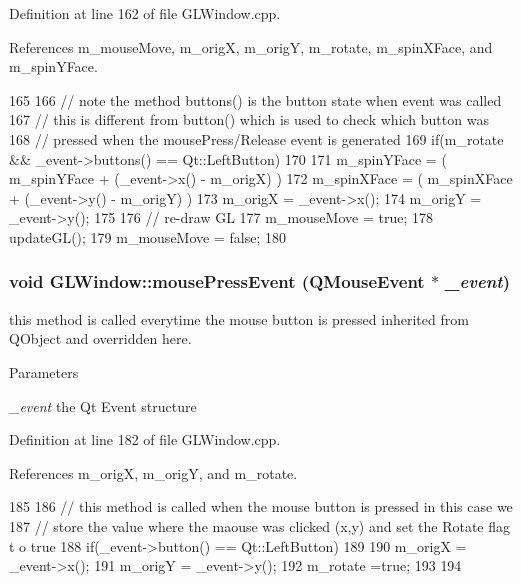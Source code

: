 Definition at line 162 of file GLWindow.cpp.



References m\_\-mouseMove, m\_\-origX, m\_\-origY, m\_\-rotate, m\_\-spinXFace, and m\_\-spinYFace.




\begin{DoxyCode}
165 {
166   // note the method buttons() is the button state when event was called
167   // this is different from button() which is used to check which button was
168   // pressed when the mousePress/Release event is generated
169   if(m_rotate && _event->buttons() == Qt::LeftButton)
170   {
171     m_spinYFace = ( m_spinYFace + (_event->x() - m_origX) ) %
172     m_spinXFace = ( m_spinXFace + (_event->y() - m_origY) ) %
173     m_origX = _event->x();
174     m_origY = _event->y();
175   }
176   // re-draw GL
177   m_mouseMove = true;
178   updateGL();
179   m_mouseMove = false;
180 }
\end{DoxyCode}


\hypertarget{class_g_l_window_a2c4d9af80c2a7a33a46bce46276b8409}{
\subsubsection[{mousePressEvent}]{\setlength{\rightskip}{0pt plus 5cm}void GLWindow::mousePressEvent (QMouseEvent $\ast$ {\em \_\-event})}}
\label{class_g_l_window_a2c4d9af80c2a7a33a46bce46276b8409}


this method is called everytime the mouse button is pressed inherited from QObject and overridden here. 


\begin{DoxyParams}{Parameters}
\item[{\em \_\-event}]the Qt Event structure \end{DoxyParams}


Definition at line 182 of file GLWindow.cpp.



References m\_\-origX, m\_\-origY, and m\_\-rotate.




\begin{DoxyCode}
185 {
186   // this method is called when the mouse button is pressed in this case we
187   // store the value where the maouse was clicked (x,y) and set the Rotate flag t
      o true
188   if(_event->button() == Qt::LeftButton)
189   {
190     m_origX = _event->x();
191     m_origY = _event->y();
192     m_rotate =true;
193   }
194 }
\end{DoxyCode}


